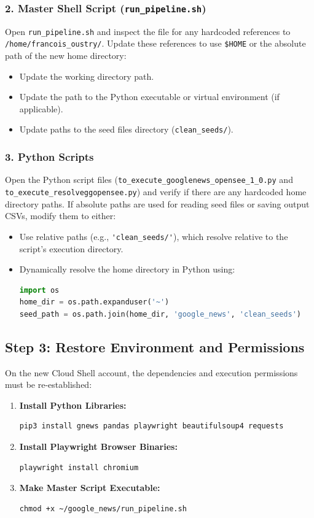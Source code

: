 \documentclass[11pt,a4paper]{article}
\begin{document}
\subsubsection{2. Master Shell Script (\texttt{run\_pipeline.sh})}
Open \verb|run_pipeline.sh| and inspect the file for any hardcoded references to \texttt{/home/francois\_oustry/}. Update these references to use \verb|$HOME| or the absolute path of the new home directory:
\begin{itemize}
    \item Update the working directory path.
    \item Update the path to the Python executable or virtual environment (if applicable).
    \item Update paths to the seed files directory (\verb|clean_seeds/|).
\end{itemize}

\subsubsection{3. Python Scripts}
Open the Python script files (\verb|to_execute_googlenews_opensee_1_0.py| and \verb|to_execute_resolveggopensee.py|) and verify if there are any hardcoded home directory paths. If absolute paths are used for reading seed files or saving output CSVs, modify them to either:
\begin{itemize}
    \item Use relative paths (e.g., \verb|'clean_seeds/'|), which resolve relative to the script's execution directory.
    \item Dynamically resolve the home directory in Python using:
    \begin{lstlisting}[language=Python, numbers=none]
import os
home_dir = os.path.expanduser('~')
seed_path = os.path.join(home_dir, 'google_news', 'clean_seeds')
    \end{lstlisting}
\end{itemize}

\subsection{Step 3: Restore Environment and Permissions}
On the new Cloud Shell account, the dependencies and execution permissions must be re-established:
\begin{enumerate}
    \item \textbf{Install Python Libraries:}
    \begin{lstlisting}[style=bash]
pip3 install gnews pandas playwright beautifulsoup4 requests
    \end{lstlisting}
    \item \textbf{Install Playwright Browser Binaries:}
    \begin{lstlisting}[style=bash]
playwright install chromium
    \end{lstlisting}
    \item \textbf{Make Master Script Executable:}
    \begin{lstlisting}[style=bash]
chmod +x ~/google_news/run_pipeline.sh
    \end{lstlisting}
\end{enumerate}
\end{document}
